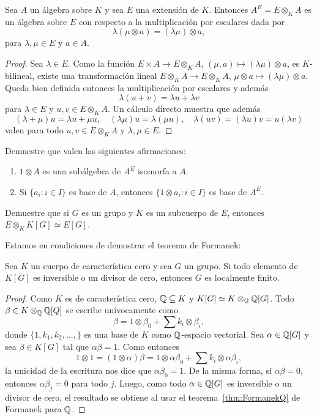 \begin{exercise}
\begin{theorem}
	Sea $A$ un álgebra sobre $K$ y sea $E$ una extensión de $K$. Entonces
	$A^E=E\otimes_KA$ es un álgebra sobre $E$ con respecto a la multiplicación
	por escalares dada por
	\[
		\lambda(\mu\otimes a)=(\lambda\mu)\otimes a,
	\]
	para $\lambda,\mu\in E$ y $a\in A$.
\end{theorem}

\begin{proof}
	Sea $\lambda\in E$. Como la función $E\times A\to E\otimes_KA$,
	$(\mu,a)\mapsto (\lambda\mu)\otimes a$, es $K$-bilineal, existe una
	transformación lineal $E\otimes_KA\to E\otimes_KA$, $\mu\otimes a\mapsto
	(\lambda\mu)\otimes a$. Queda bien definida entonces la multiplicación por
	escalares y además 
	\[
	\lambda(u+v)=\lambda u+\lambda v
	\]
	para $\lambda\in E$ y $u,v\in E\otimes_KA$. Un cálculo directo muestra que además 
	\[
	(\lambda+\mu)u=\lambda u+\mu u,
	\quad
	(\lambda\mu)u=\lambda(\mu u),
	\quad
	\lambda(uv)=(\lambda u)v=u(\lambda v)
	\]
	valen para todo $u,v\in E\otimes_KA$ y $\lambda,\mu\in E$.
\end{proof}

\begin{exercise}
	Demuestre que valen las siguientes afirmaciones:
	\begin{enumerate}
		\item $1\otimes A$ es una subálgebra de $A^E$ isomorfa a $A$.
		\item Si $\{a_i:i\in I\}$ es base de $A$, entonces $\{1\otimes a_i:i\in
			I\}$ es base de $A^E$.
	\end{enumerate}
\end{exercise}

\begin{exercise}
	Demuestre que si $G$ es un grupo y $K$ es un subcuerpo de $E$, entonces
	$E\otimes_K K[G]\simeq E[G]$.
\end{exercise}

Estamos en condiciones de demostrar el teorema de Formanek:

\begin{theorem}[Formanek]
	Sea $K$ un cuerpo de característica cero y sea $G$ un grupo. Si todo
	elemento de $K[G]$ es inversible o un divisor de cero, entonces $G$ es
	localmente finito.
\end{theorem}

\begin{proof}
	Como $K$ es de característica cero, $\mathbb{Q}\subseteq K$ y $K[G]\simeq
	K\otimes_{\mathbb{Q}}\mathbb{Q}[G]$. Todo $\beta\in K\otimes_{\mathbb{Q}}\mathbb{Q}[Q]$ se escribe
	unívocamente como 
	\[
		\beta=1\otimes\beta_0+\sum k_i\otimes\beta_i,
	\]
	donde $\{1,k_1,k_2,\dots,\}$ es una base de $K$ como $\mathbb{Q}$-espacio
	vectorial. Sea $\alpha\in\mathbb{Q}[G]$ y sea $\beta\in K[G]$ tal que $\alpha\beta=1$. Como entonces 
	\[
	1\otimes 1=(1\otimes\alpha)\beta=1\otimes \alpha\beta_0+\sum k_i\otimes \alpha\beta_i,
	\]
	la unicidad de la escritura nos dice que $\alpha\beta_0=1$. De la misma
	forma, si $\alpha\beta=0$, entonces $\alpha\beta_j=0$ para todo $j$. Luego,
	como todo $\alpha\in\mathbb{Q}[G]$ es inversible o un divisor de cero, el resultado
	se obtiene al usar el teorema~\ref{thm:FormanekQ} de Formanek para $\mathbb{Q}$.
\end{proof}


\end{exercise}
